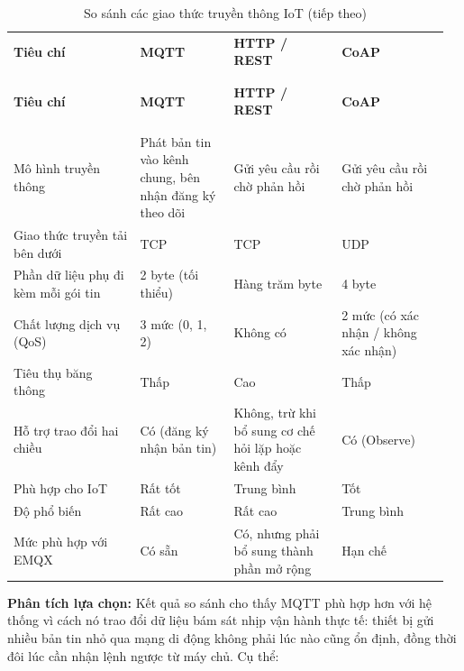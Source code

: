 \documentclass[a4paper]{extarticle}
\newcommand{\thesissettableid}[2]{%
  \renewcommand{\thetable}{#1}%
  \renewcommand{\theHtable}{#2}%
}
\begin{document}
{\thesissettableid{2.2}{tab-ch2-iot-communication-protocols}
\def\LTcaptype{table}
\begin{longtable}{|L{0.279\linewidth}|L{0.206\linewidth}|L{0.232\linewidth}|L{0.238\linewidth}|}
\caption{So sánh các giao thức truyền thông IoT}\label{tab:ch2-iot-communication-protocols}\\
\hline \textbf{Tiêu chí} & \textbf{MQTT} & \textbf{HTTP / REST} & \textbf{CoAP} \\
\\\hline
\endfirsthead
\caption[]{So sánh các giao thức truyền thông IoT (tiếp theo)}\\
\hline \textbf{Tiêu chí} & \textbf{MQTT} & \textbf{HTTP / REST} & \textbf{CoAP} \\
\\\hline
\endhead
\\\hline
\endfoot
\endlastfoot
Mô hình truyền thông & Phát bản tin vào kênh chung, bên nhận đăng ký
theo dõi & Gửi yêu cầu rồi chờ phản hồi &
Gửi yêu cầu rồi chờ phản hồi \\\hline
Giao thức truyền tải bên dưới & TCP & TCP & UDP \\\hline
Phần dữ liệu phụ đi kèm mỗi gói tin & 2 byte (tối thiểu) & Hàng trăm
byte & 4 byte \\\hline
Chất lượng dịch vụ (QoS) & 3 mức (0, 1, 2) & Không có & 2 mức
(có xác nhận / không xác nhận) \\\hline
Tiêu thụ băng thông & Thấp & Cao & Thấp \\\hline
Hỗ trợ trao đổi hai chiều & Có (đăng ký nhận bản tin) & Không, trừ khi
bổ sung cơ chế hỏi lặp hoặc kênh đẩy & Có (Observe) \\\hline
Phù hợp cho IoT & Rất tốt & Trung bình & Tốt \\\hline
Độ phổ biến & Rất cao & Rất cao & Trung bình \\\hline
Mức phù hợp với EMQX & Có sẵn & Có, nhưng phải bổ sung thành phần mở rộng
& Hạn chế \\\hline
\end{longtable}
}

\textbf{Phân tích lựa chọn:} Kết quả so sánh cho thấy MQTT phù hợp hơn
với hệ thống vì cách nó trao đổi dữ liệu bám sát nhịp vận hành thực tế:
thiết bị gửi nhiều bản tin nhỏ qua mạng di động không phải lúc nào cũng
ổn định, đồng thời đôi lúc cần nhận lệnh ngược từ máy chủ. Cụ thể:
\end{document}
